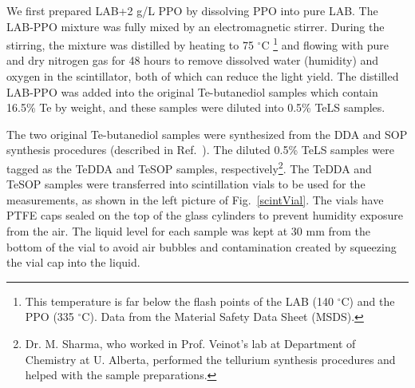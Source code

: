 We first prepared LAB+2 g/L PPO by dissolving PPO into pure LAB. The LAB-PPO mixture was fully mixed by an electromagnetic stirrer. During the stirring, the mixture was distilled by heating to 75 $^\circ$C \footnote{This temperature is far below the flash points of the LAB (140 $^\circ$C) and the PPO (335 $^\circ$C). Data from the Material Safety Data Sheet (MSDS).} and flowing with pure and dry nitrogen gas for 48 hours to remove dissolved water (humidity) and oxygen in the scintillator, both of which can reduce the light yield. The distilled LAB-PPO was added into the original Te-butanediol samples which contain 16.5\% Te by weight, and these samples were diluted into 0.5\% TeLS samples. 

The two original Te-butanediol samples were synthesized from the DDA and SOP synthesis procedures (described in Ref.~\cite{teLoadingPaper}). The diluted 0.5\% TeLS samples were tagged as the TeDDA and TeSOP samples, respectively\footnote{Dr. M. Sharma, who worked in Prof. Veinot's lab at Department of Chemistry at U. Alberta, performed the tellurium synthesis procedures and helped with the sample preparations.}. The TeDDA and TeSOP samples were transferred into scintillation vials to be used for the measurements, as shown in the left picture of Fig.~\ref{scintVial}. The vials have PTFE caps sealed on the top of the glass cylinders to prevent humidity exposure from the air. The liquid level for each sample was kept at 30 mm from the bottom of the vial to avoid air bubbles and contamination created by squeezing the vial cap into the liquid.

